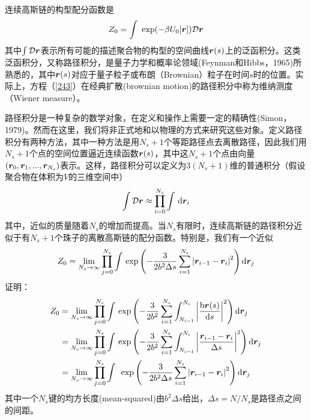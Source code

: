 连续高斯链的构型配分函数是
\begin{equation}
Z_0=\int ~\exp(-\beta U_0[\bm{r} ])\mathcal{D} \bm{r}  \label{243}
\end{equation}
其中$\int \mathcal{D} \bm{r} $表示所有可能的描述聚合物的构型的空间曲线$\bm{r} (s)$上的泛函积分。这类泛函积分，又称路径积分，是量子力学和概率论领域(Feynman和Hibbs，1965)所熟悉的，其中$\bm{r} (s)$对应于量子粒子或布朗（Brownian）粒子在时间$s$时的位置。实际上，方程（\ref{243}）在经典扩散(brownian motion)的路径积分中称为维纳测度（Wiener measure）。

路径积分是一种复杂的数学对象，在定义和操作上需要一定的精确性(Simon，1979)。然而在这里，我们将非正式地和以物理的方式来研究这些对象。定义路径积分有两种方法，其中一种方法是用$N_s+1$个等距路径点去离散路径，因此我们用$N_s+1$个点的空间位置逼近连续函数$\bm{r} (s)$，其中这$N_s+1$个点由向量$(\bm{r} _0,\bm{r} _1,...,\bm{r} _{N_s})$表示。这样，路径积分可以定义为$3(N_s+1)$维的普通积分（假设聚合物在体积为$V$的三维空间中）
\begin{equation}\label{244}
\int \mathcal{D} \bm{r} \approx \prod_{i=0}^{N_s} \int \, \mathrm{d} \bm{r} _i
\end{equation}
其中，近似的质量随着$N_s$的增加而提高。当$N_s$有限时，连续高斯链的路径积分近似于有$N_s+1$个珠子的离散高斯链的配分函数。特别是，我们有一个近似
\begin{equation}\label{245}
Z_0=\lim_{N_s \to \infty} \prod_{j=0}^{N_s} \int \,\exp \left( -\frac{3}{2b^2\Delta s}\sum_{i=1}^{N_s}\left|\bm{r} _{i-1}-\bm{r} _i \right|^2 \right) \mathrm{d} \bm{r} _j 
\end{equation}
证明：
\begin{equation*}
\begin{aligned}
Z_0 &=\lim_{N_s \to \infty} \prod_{j=0}^{N_s} \int \,\exp\left(-\frac{3}{2b^2} \sum_{i=1}^{N_s} \int _{N_{i-1}}^{N_i} \left| \frac{\mathrm{b} \bm{r}  (s) } {\mathrm{d} s} \right|^2 \right) \mathrm{d} \bm{r} _j\\ 
& =  \lim_{N_s \to \infty} \prod_{j=0}^{N_s} \int \, \exp\left(-\frac{3}{2b^2}\sum_{i=1}^{N_s}\int _{N_{i-1}}^{N_i}\left|\frac{\bm{r} _{i-1}-\bm{r} _i}{\Delta s} \right|^2 \right)\mathrm{d} \bm{r} _j \\ 
&=  \lim_{N_s \to \infty} \prod_{j=0}^{N_s} \int \,~\exp \left( -\frac{3}{2b^2\Delta s}\sum_{i=1}^{N_s}\left|\bm{r} _{i-1}-\bm{r} _i \right|^2 \right) \mathrm{d} \bm{r} _j\\ 
\end{aligned}
\end{equation*}
其中一个$N_s$键的均方长度(mean-squared)由$b^2\Delta s$给出，$\Delta s=N/N_s$是路径点之间的间距。

